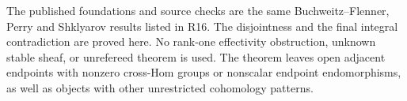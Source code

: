 The published foundations and source checks are the
same Buchweitz--Flenner, Perry and Shklyarov results
listed in R16. The disjointness and the final integral
contradiction are proved here. No rank-one effectivity
obstruction, unknown stable sheaf, or unrefereed theorem
is used. The theorem leaves open adjacent endpoints with
nonzero cross-Hom groups or nonscalar endpoint
endomorphisms, as well as objects with other unrestricted
cohomology patterns.
